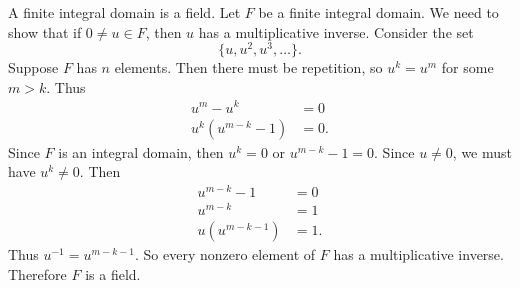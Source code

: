 \begin{theorem}{
    A finite integral domain is a field.
}
    Let $F$ be a finite integral domain.
    We need to show that if $0\neq u\in F$, then $u$ has a multiplicative inverse.
    Consider the set
    \[
        \{u,u^2,u^3,\hdots\}.
    \]
    Suppose $F$ has $n$ elements.
    Then there must be repetition, so $u^k=u^m$ for some $m>k$.
    Thus
    \begin{align*}
        u^m-u^k &= 0\\
        u^k(u^{m-k}-1) &= 0.
    \end{align*}
    Since $F$ is an integral domain, then $u^k=0$ or $u^{m-k}-1=0$.
    Since $u\neq 0$, we must have $u^k\neq 0$.
    Then
    \begin{align*}
        u^{m-k}-1 &= 0\\
        u^{m-k} &= 1\\
        u(u^{m-k-1}) &= 1.
    \end{align*}
    Thus $u^{-1}=u^{m-k-1}$.
    So every nonzero element of $F$ has a multiplicative inverse.
    Therefore $F$ is a field.
\end{theorem}